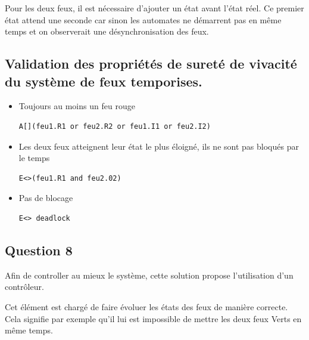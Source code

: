 \documentclass[11pt]{article}
\begin{document}
Pour les deux feux, il est nécessaire d'ajouter un état avant l'état réel. Ce premier état attend une seconde car sinon les automates ne démarrent pas en même temps et on observerait une désynchronisation des feux.


\subsection*{Validation des propriétés de sureté de vivacité du système de feux temporises.}

\begin{itemize}
	\item Toujours au moins un feu rouge
\begin{verbatim}
A[](feu1.R1 or feu2.R2 or feu1.I1 or feu2.I2)
\end{verbatim}

	\item Les deux feux atteignent leur état le plus éloigné, ils ne sont pas bloqués par le temps
\begin{verbatim}
E<>(feu1.R1 and feu2.02)	
\end{verbatim}

	\item Pas de blocage
\begin{verbatim}
E<> deadlock
\end{verbatim}

\end{itemize}

\subsection{Question 8}

Afin de controller au mieux le système, cette solution propose l'utilisation d'un contrôleur. 

Cet élément est chargé de faire évoluer les états des feux de manière correcte. Cela signifie par exemple qu'il lui est impossible de mettre les deux feux Verts en même temps.
\end{document}
